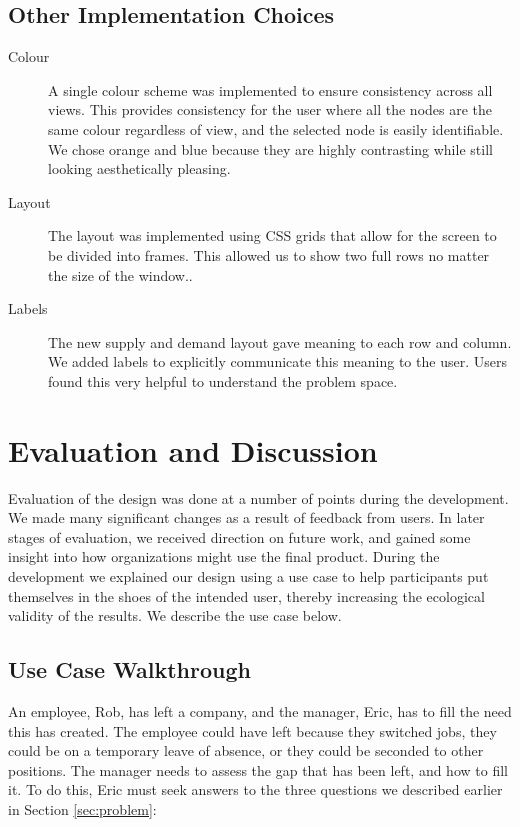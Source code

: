 \documentclass[journal]{vgtc}                %
\begin{document}
\subsection{Other Implementation Choices}

\begin{description}
\item [Colour] A single colour scheme was implemented to ensure consistency across all views.  This provides consistency for the user where all the nodes are the same colour regardless of view, and the selected node is easily identifiable. We chose orange and blue because they are highly contrasting while still looking aesthetically pleasing.
\item[Layout] The layout was implemented using CSS grids that allow for the screen to be divided into frames.  This allowed us to show two full rows no matter the size of the window..
\item[Labels] The new supply and demand layout gave meaning to each row and column. We added labels to explicitly communicate this meaning to the user.  Users found this very helpful to understand the problem space.
\end{description}

\section{Evaluation and Discussion}
\label{sec:evaldiscuss}

Evaluation of the design was done at a number of points during the development. We made many significant changes as a result of feedback from users. In later stages of evaluation, we received direction on future work, and gained some insight into how organizations might use the final product.  During the development we explained our design using a use case to help participants put themselves in the shoes of the intended user, thereby increasing the ecological validity of the results. We describe the use case below. 

\subsection{Use Case Walkthrough}
An employee, Rob, has left a company, and the manager, Eric, has to fill the need this has created. The employee could have left because they switched jobs, they could be on a temporary leave of absence, or they could be seconded to other positions. The manager needs to assess the gap that has been left, and how to fill it. To do this, Eric must seek answers to the three questions we described earlier in Section \ref{sec:problem}:
\end{document}
